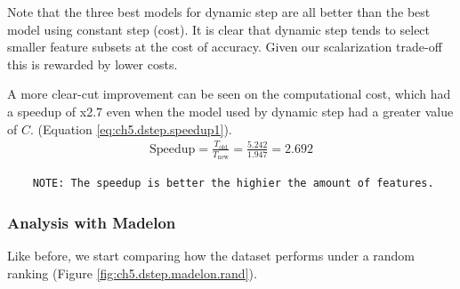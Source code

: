 Note that the three best models for dynamic step are all better than the best model using constant step (cost). It is clear that dynamic step tends to select smaller feature subsets at the cost of accuracy. Given our scalarization trade-off this is re\-ward\-ed by lower costs.

A more clear-cut improvement can be seen on the computational cost, which had a speedup of x2.7 even when the model used by dynamic step had a greater value of $C$. (Equation \ref{eq:ch5.dstep.speedup1}).
\label{eq:ch5.dstep.speedup1}
\begin{align}
    \text{Speedup} = \frac{T_{\text{old}}}{T_{\text{new}}} = \frac{5.242}{1.947} = 2.692
\end{align}

\begin{verbatim}
    NOTE: The speedup is better the highier the amount of features.
\end{verbatim}


\subsubsection*{Analysis with Madelon}

Like before, we start comparing how the dataset performs under a random ranking (Figure \ref{fig:ch5.dstep.madelon.rand}).

